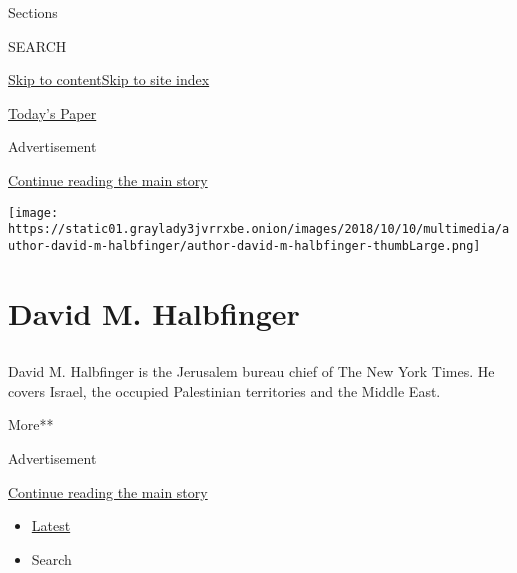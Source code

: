 Sections

SEARCH

\protect\hyperlink{site-content}{Skip to
content}\protect\hyperlink{site-index}{Skip to site index}

\href{https://myaccount.nytimes3xbfgragh.onion/auth/login?response_type=cookie\&client_id=vi}{}

\href{https://www.nytimes3xbfgragh.onion/section/todayspaper}{Today's
Paper}

Advertisement

\protect\hyperlink{after-top}{Continue reading the main story}

\texttt{[image: https://static01.graylady3jvrrxbe.onion/images/2018/10/10/multimedia/author-david-m-halbfinger/author-david-m-halbfinger-thumbLarge.png]}

\hypertarget{david-m-halbfinger}{%
\section{David M. Halbfinger}\label{david-m-halbfinger}}

\subsection{}

David M. Halbfinger is the Jerusalem bureau chief of The New York Times.
He covers Israel, the occupied Palestinian territories and the Middle
East.~

More**

Advertisement

\protect\hyperlink{after-mid1}{Continue reading the main story}

\begin{itemize}
\tightlist
\item
  \protect\hyperlink{stream-panel}{Latest}
\item
  Search
\end{itemize}

